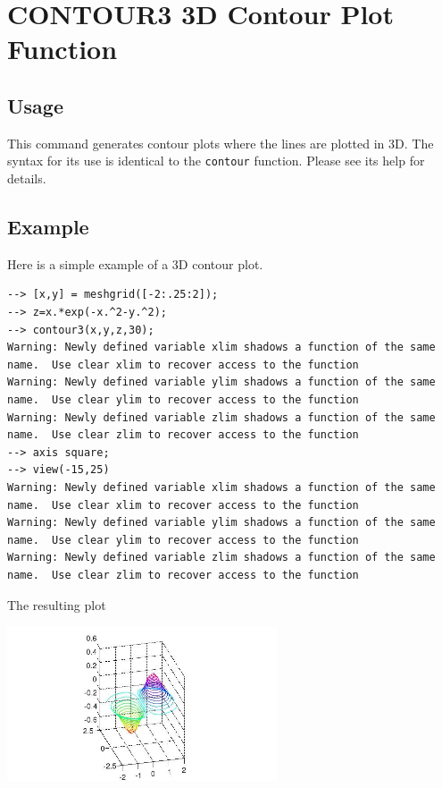 \section{CONTOUR3 3D Contour Plot Function}

\subsection{Usage}

This command generates contour plots where the lines are plotted in 3D.
The syntax for its use is identical to the \verb|contour| function.  Please
see its help for details.
\subsection{Example}

Here is a simple example of a 3D contour plot.
\begin{verbatim}
--> [x,y] = meshgrid([-2:.25:2]);
--> z=x.*exp(-x.^2-y.^2);
--> contour3(x,y,z,30);
Warning: Newly defined variable xlim shadows a function of the same name.  Use clear xlim to recover access to the function
Warning: Newly defined variable ylim shadows a function of the same name.  Use clear ylim to recover access to the function
Warning: Newly defined variable zlim shadows a function of the same name.  Use clear zlim to recover access to the function
--> axis square;
--> view(-15,25)
Warning: Newly defined variable xlim shadows a function of the same name.  Use clear xlim to recover access to the function
Warning: Newly defined variable ylim shadows a function of the same name.  Use clear ylim to recover access to the function
Warning: Newly defined variable zlim shadows a function of the same name.  Use clear zlim to recover access to the function
\end{verbatim}
The resulting plot


\centerline{\includegraphics[width=8cm]{contour3_1}}

